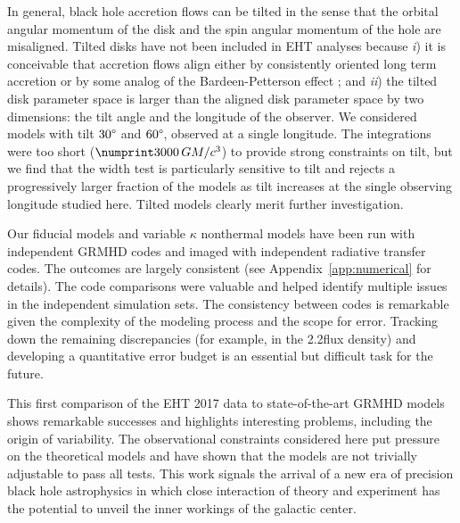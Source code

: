 In general, black hole accretion flows can be tilted in the sense that the orbital angular momentum of the disk and the spin angular momentum of the hole are misaligned.
Tilted disks have not been included in EHT analyses because
\emph{i}) it is conceivable that accretion flows align either by consistently oriented long term accretion or by some analog of the Bardeen-Petterson effect \citep{1975ApJ...195L..65B}; and
\emph{ii}) the tilted disk parameter space is larger than the aligned disk parameter space by two dimensions: the tilt angle and the longitude of the observer.
We considered models with tilt $30\degree$ and $60\degree$, observed at a single longitude.
The integrations were too short ($\no{3000}\,\tg$) to provide strong constraints on tilt, but we find that the \mring width test is particularly sensitive to tilt and rejects a progressively larger fraction of the models as tilt increases at the single observing longitude studied here.
Tilted models clearly merit further investigation.

Our fiducial models and variable $\kappa$ nonthermal models have been run with independent GRMHD codes and imaged with independent radiative transfer codes.
The outcomes are largely consistent (see Appendix~\ref{app:numerical} for details).
The code comparisons were valuable and helped identify multiple issues in the independent simulation sets.
The consistency between codes is remarkable given the complexity of the modeling process and the scope for error.
Tracking down the remaining discrepancies (for example, in the 2.2\um flux density) and developing a quantitative error budget is an essential but difficult task for the future.

This first comparison of the EHT 2017 \sgra data to state-of-the-art GRMHD models shows remarkable successes and highlights interesting problems, including the origin of variability.
The observational constraints considered here put pressure on the theoretical models and have shown that the models are not trivially adjustable to pass all tests.
This work signals the arrival of a new era of precision black hole astrophysics in which close interaction of theory and experiment has the potential to unveil the inner workings of the galactic center.
